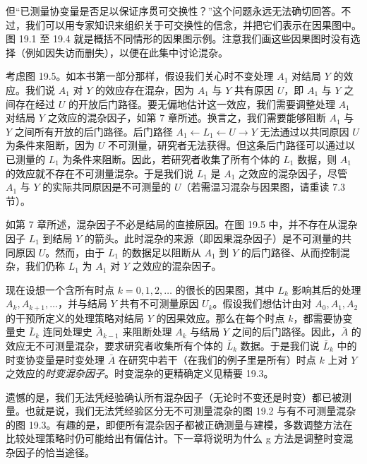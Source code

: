 但“已测量协变量是否足以保证序贯可交换性？”这个问题永远无法确切回答。不过，我们可以用专家知识来组织关于可交换性的信念，并把它们表示在因果图中。图 19.1 至 19.4 就是概括不同情形的因果图示例。注意我们画这些因果图时没有选择（例如因失访而删失），以便在此集中讨论混杂。

考虑图 19.5。如本书第一部分那样，假设我们关心时不变处理 $A_1$ 对结局 $Y$ 的效应。我们说 $A_1$ 对 $Y$ 的效应存在混杂，因为 $A_1$ 与 $Y$ 共有原因 $U$，即 $A_1$ 与 $Y$ 之间存在经过 $U$ 的开放后门路径。要无偏地估计这一效应，我们需要调整处理 $A_1$ 对结局 $Y$ 之效应的混杂因子，如第 7 章所述。换言之，我们需要能够阻断 $A_1$ 与 $Y$ 之间所有开放的后门路径。后门路径 $A_1\leftarrow L_1\leftarrow U\rightarrow Y$ 无法通过以共同原因 $U$ 为条件来阻断，因为 $U$ 不可测量，研究者无法获得。但这条后门路径可以通过以已测量的 $L_1$ 为条件来阻断。因此，若研究者收集了所有个体的 $L_1$ 数据，则 $A_1$ 的效应就不存在不可测量混杂。于是我们说 $L_1$ 是 $A_1$ 之效应的混杂因子，尽管 $A_1$ 与 $Y$ 的实际共同原因是不可测量的 $U$（若需温习混杂与因果图，请重读 7.3 节）。

如第 7 章所述，混杂因子不必是结局的直接原因。在图 19.5 中，并不存在从混杂因子 $L_1$ 到结局 $Y$ 的箭头。此时混杂的来源（即因果混杂因子）是不可测量的共同原因 $U$。然而，由于 $L_1$ 的数据足以阻断从 $A_1$ 到 $Y$ 的后门路径、从而控制混杂，我们仍称 $L_1$ 为 $A_1$ 对 $Y$ 之效应的混杂因子。


现在设想一个含所有时点 $k=0,1,2,\ldots$ 的很长的因果图，其中 $L_k$ 影响其后的处理 $A_k,A_{k+1},\ldots$，并与结局 $Y$ 共有不可测量原因 $U_k$。假设我们想估计由对 $A_0,A_1,A_2$ 的干预所定义的处理策略对结局 $Y$ 的因果效应。那么在每个时点 $k$，都需要协变量史 $\bar{L}_k$ 连同处理史 $\bar{A}_{k-1}$ 来阻断处理 $A_k$ 与结局 $Y$ 之间的后门路径。因此，$\bar{A}$ 的效应无不可测量混杂，要求研究者收集所有个体的 $\bar{L}_k$ 数据。于是我们说 $\bar{L}_k$ 中的时变协变量是时变处理 $\bar{A}$ 在研究中若干（在我们的例子里是所有）时点 $k$ 上对 $Y$ 之效应的\emph{时变混杂因子}。时变混杂的更精确定义见精要 19.3。


遗憾的是，我们无法凭经验确认所有混杂因子（无论时不变还是时变）都已被测量。也就是说，我们无法凭经验区分无不可测量混杂的图 19.2 与有不可测量混杂的图 19.3。有趣的是，即便所有混杂因子都被正确测量与建模，多数调整方法在比较处理策略时仍可能给出有偏估计。下一章将说明为什么 g 方法是调整时变混杂因子的恰当途径。

